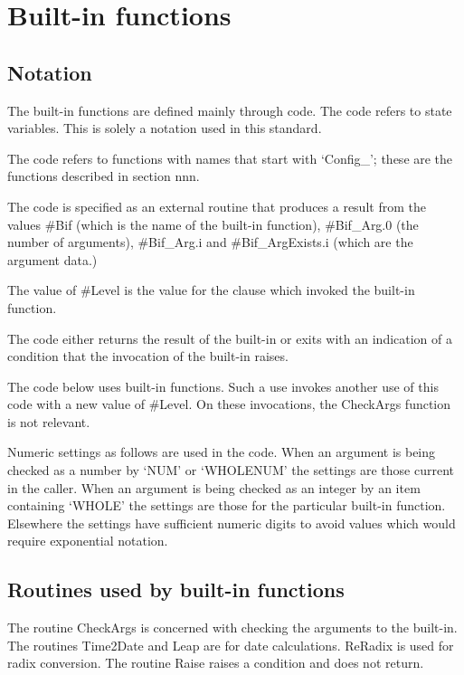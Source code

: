 \hypertarget{built-in-functions}{%
\chapter{Built-in functions}\label{built-in-functions}}

\hypertarget{notation}{%
\section{Notation}\label{notation}}

The built-in functions are defined mainly through code. The code refers
to state variables. This is solely a notation used in this standard.

The code refers to functions with names that start with `Config\_';
these are the functions described in section nnn.

The code is specified as an external routine that produces a result from
the values \#Bif (which is the name of the built-in function),
\#Bif\_Arg.0 (the number of arguments), \#Bif\_Arg.i and
\#Bif\_ArgExists.i (which are the argument data.)

The value of \#Level is the value for the clause which invoked the
built-in function.

The code either returns the result of the built-in or exits with an
indication of a condition that the invocation of the built-in raises.

The code below uses built-in functions. Such a use invokes another use
of this code with a new value of \#Level. On these invocations, the
CheckArgs function is not relevant.

Numeric settings as follows are used in the code. When an argument is
being checked as a number by `NUM' or `WHOLENUM' the settings are those
current in the caller. When an argument is being checked as an integer
by an item containing `WHOLE' the settings are those for the particular
built-in function. Elsewhere the settings have sufficient numeric digits
to avoid values which would require exponential notation.

\hypertarget{routines-used-by-built-in-functions}{%
\section{Routines used by built-in
functions}\label{routines-used-by-built-in-functions}}

The routine CheckArgs is concerned with checking the arguments to the
built-in. The routines Time2Date and Leap are for date calculations.
ReRadix is used for radix conversion. The routine Raise raises a
condition and does not return.

